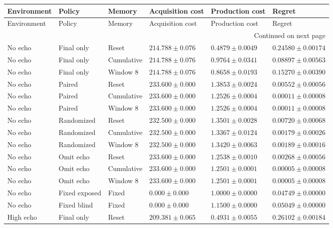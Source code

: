 \begin{longtable}{@{}llllll@{}}
\toprule Environment & Policy & Memory & Acquisition cost & Production cost & Regret \\\midrule\endfirsthead
\toprule Environment & Policy & Memory & Acquisition cost & Production cost & Regret \\\midrule\endhead
\midrule\multicolumn{6}{r}{Continued on next page}\\\endfoot
\bottomrule\endlastfoot
No echo & Final only & Reset & $214.788 \pm 0.076$ & $0.4879 \pm 0.0049$ & $0.24580 \pm 0.00174$ \\
No echo & Final only & Cumulative & $214.788 \pm 0.076$ & $0.9764 \pm 0.0341$ & $0.08897 \pm 0.00563$ \\
No echo & Final only & Window 8 & $214.788 \pm 0.076$ & $0.8658 \pm 0.0193$ & $0.15270 \pm 0.00390$ \\
No echo & Paired & Reset & $233.600 \pm 0.000$ & $1.3853 \pm 0.0024$ & $0.00552 \pm 0.00056$ \\
No echo & Paired & Cumulative & $233.600 \pm 0.000$ & $1.2526 \pm 0.0004$ & $0.00011 \pm 0.00008$ \\
No echo & Paired & Window 8 & $233.600 \pm 0.000$ & $1.2526 \pm 0.0004$ & $0.00011 \pm 0.00008$ \\
No echo & Randomized & Reset & $232.500 \pm 0.000$ & $1.3501 \pm 0.0028$ & $0.00720 \pm 0.00068$ \\
No echo & Randomized & Cumulative & $232.500 \pm 0.000$ & $1.3367 \pm 0.0124$ & $0.00179 \pm 0.00026$ \\
No echo & Randomized & Window 8 & $232.500 \pm 0.000$ & $1.3420 \pm 0.0063$ & $0.00189 \pm 0.00016$ \\
No echo & Omit echo & Reset & $233.600 \pm 0.000$ & $1.2538 \pm 0.0010$ & $0.00268 \pm 0.00056$ \\
No echo & Omit echo & Cumulative & $233.600 \pm 0.000$ & $1.2501 \pm 0.0001$ & $0.00005 \pm 0.00008$ \\
No echo & Omit echo & Window 8 & $233.600 \pm 0.000$ & $1.2501 \pm 0.0001$ & $0.00005 \pm 0.00008$ \\
No echo & Fixed exposed & Fixed & $0.000 \pm 0.000$ & $1.0000 \pm 0.0000$ & $0.04749 \pm 0.00000$ \\
No echo & Fixed blind & Fixed & $0.000 \pm 0.000$ & $1.1500 \pm 0.0000$ & $0.05049 \pm 0.00000$ \\
High echo & Final only & Reset & $209.381 \pm 0.065$ & $0.4931 \pm 0.0055$ & $0.26102 \pm 0.00184$ \\

\end{longtable}

